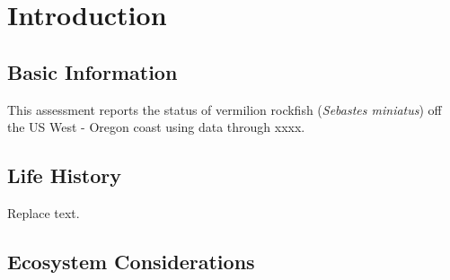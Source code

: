 \documentclass[11pt,
  english,
  a4paper,
]{article}
\begin{document}
\setlength\parskip{0.5em plus 0.1em minus 0.2em}


\hypertarget{introduction}{%
\section{Introduction}\label{introduction}}

\leavevmode\tagmcend\tagstructend


\hypertarget{basic-information}{%
\subsection{Basic Information}\label{basic-information}}

\leavevmode\tagmcend\tagstructend


This assessment reports the status of vermilion rockfish (\emph{Sebastes miniatus}) off the US West - Oregon coast using data through xxxx.

\leavevmode\tagmcend\tagstructend\par


\hypertarget{life-history}{%
\subsection{Life History}\label{life-history}}

\leavevmode\tagmcend\tagstructend


Replace text.

\leavevmode\tagmcend\tagstructend\par


\hypertarget{ecosystem-considerations}{%
\subsection{Ecosystem Considerations}\label{ecosystem-considerations}}

\leavevmode\tagmcend\tagstructend

\end{document}
